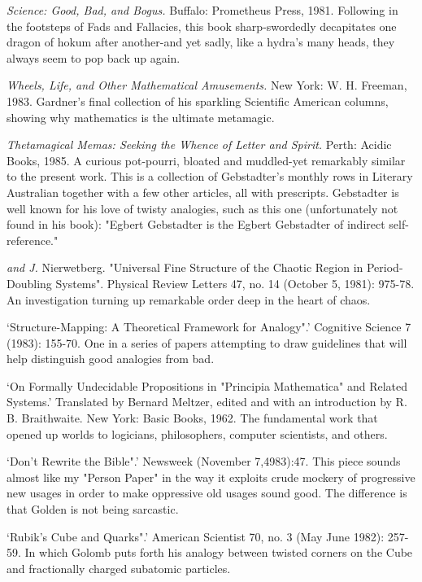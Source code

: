  {\sl Science: Good, Bad, and Bogus.} Buffalo: Prometheus Press, 1981. Following in the footsteps of Fads and Fallacies, this book sharp-swordedly decapitates one dragon of hokum after another-and yet sadly, like a hydra's many heads, they always seem to pop back up again.

 {\sl Wheels, Life, and Other Mathematical Amusements.} New York: W. H. Freeman, 1983. Gardner's final collection of his sparkling Scientific American columns, showing why mathematics is the ultimate metamagic.

 {\sl Thetamagical Memas: Seeking the Whence of Letter and Spirit.} Perth: Acidic Books, 1985. A curious pot-pourri, bloated and muddled-yet remarkably similar to the present work. This is a collection of Gebstadter's monthly rows in Literary Australian together with a few other articles, all with prescripts. Gebstadter is well known for his love of twisty analogies, such as this one (unfortunately not found in his book): "Egbert Gebstadter is the Egbert Gebstadter of indirect self-reference."

 {\sl and J.} Nierwetberg. "Universal Fine Structure of the Chaotic Region in Period- Doubling Systems". Physical Review Letters 47, no. 14 (October 5, 1981): 975-78. An investigation turning up remarkable order deep in the heart of chaos.

 `Structure-Mapping: A Theoretical Framework for Analogy".' Cognitive Science 7 (1983): 155-70. One in a series of papers attempting to draw guidelines that will help distinguish good analogies from bad.

 `On Formally Undecidable Propositions in "Principia Mathematica" and Related Systems.' Translated by Bernard Meltzer, edited and with an introduction by R. B. Braithwaite. New York: Basic Books, 1962. The fundamental work that opened up worlds to logicians, philosophers, computer scientists, and others.

 `Don't Rewrite the Bible".' Newsweek (November 7,4983):47. This piece sounds almost like my "Person Paper" in the way it exploits crude mockery of progressive new usages in order to make oppressive old usages sound good. The difference is that Golden is not being sarcastic.

 `Rubik's Cube and Quarks".' American Scientist 70, no. 3 (May June 1982): 257-59. In which Golomb puts forth his analogy between twisted corners on the Cube and fractionally charged subatomic particles.

